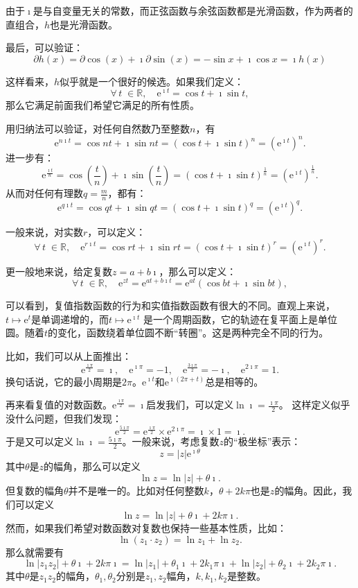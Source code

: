 \documentclass[12pt,UTF8]{ctexbook}
\newcommand{\e}{\mathrm{e}}
\theoremstyle{definition}
\theoremstyle{plain}
\begin{document}
由于$\imath$是与自变量无关的常数，而正弦函数与余弦函数都是光滑函数，作为两者的直组合，$h$也是光滑函数。

最后，可以验证：
$$ \partial h(x) = \partial \cos{(x)} + \imath \partial \sin{(x)} = - \sin{x} + \imath \cos{x} = \imath h(x) $$

这样看来，$h$似乎就是一个很好的候选。如果我们定义：
$$ \forall \, t \; \in \mathbb{R}, \quad  \e^{\imath t} = \cos{t} + \imath \sin{t}, $$
那么它满足前面我们希望它满足的所有性质。

用归纳法可以验证，对任何自然数乃至整数$n$，有
$$ \e^{n\imath t} = \cos{nt} + \imath \sin{nt} = (\cos{t} + \imath \sin{t})^n = \left( \e^{\imath t} \right)^n. $$
进一步有：
$$ \e^{\frac{\imath t}{n}} = \cos{\left(\frac{t}{n}\right)} + \imath \sin{\left(\frac{t}{n}\right)} = (\cos{t} + \imath \sin{t})^{\frac{1}{n}} = \left( \e^{\imath t} \right)^{\frac{1}{n}}. $$
从而对任何有理数$q = \frac{m}{n}$，都有：
$$ \e^{q\imath t} = \cos{qt} + \imath \sin{qt} = (\cos{t} + \imath \sin{t})^q = \left( \e^{\imath t} \right)^q. $$

一般来说，对实数$r$，可以定义：
$$ \forall \, t \; \in \mathbb{R}, \quad \e^{r\imath t} = \cos{rt} + \imath \sin{rt} = (\cos{t} + \imath \sin{t})^r = \left( \e^{\imath t} \right)^r. $$

更一般地来说，给定复数$z = a + b\imath$，那么可以定义：
$$ \forall \, t \; \in \mathbb{R}, \quad  \e^{z t} = \e^{at + b\imath t} = \e^{at} \left( \cos{bt} + \imath \sin{bt} \right), $$

可以看到，复值指数函数的行为和实值指数函数有很大的不同。直观上来说，$t\mapsto \e^{t}$是单调递增的，而$t\mapsto \e^{\imath t}$
是一个周期函数，它的轨迹在复平面上是单位圆。随着$t$的变化，函数绕着单位圆不断“转圈”。这是两种完全不同的行为。

比如，我们可以从上面推出：
$$ \e^{\frac{\imath\pi}{2}} = \imath, \quad \e^{\imath\pi} = -1, \quad \e^{\frac{3\imath\pi}{2}} = -\imath, \quad \e^{2\imath\pi} = 1. $$
换句话说，它的最小周期是$2\pi$。$\e^{\imath t}$和$\e^{\imath(2\pi + t)}$总是相等的。

再来看复值的对数函数。$\e^{\frac{\imath\pi}{2}} = \imath$启发我们，可以定义$\ln{\imath} = \frac{\imath\pi}{2}$。
这样定义似乎没什么问题，但我们发现：
$$ \e^{\frac{5\imath\pi}{2}} = \e^{\frac{\imath\pi}{2}} \times \e^{2\imath\pi} = \imath \times 1 = \imath. $$
于是又可以定义$\ln{\imath} = \frac{5\imath\pi}{2}$。一般来说，考虑复数$z$的“极坐标”表示：
$$ z = |z| \e^{\imath \theta}$$
其中$\theta$是$z$的幅角，那么可以定义
$$\ln{z} = \ln{|z|} + \theta \imath.$$
但复数的幅角$\theta$并不是唯一的。比如对任何整数$k$，$\theta + 2k\pi$也是$z$的幅角。因此，我们可以定义
$$\ln{z} = \ln{|z|} + \theta \imath + 2k\pi\imath.$$
然而，如果我们希望对数函数对复数也保持一些基本性质，比如：
$$ \ln{(z_1 \cdot z_2)} = \ln{z_1} + \ln{z_2}. $$
那么就需要有
$$ \ln{|z_1z_2|} + \theta \imath + 2k\pi\imath = \ln{|z_1|} + \theta_1 \imath + 2k_1\pi\imath + \ln{|z_2|} + \theta_2 \imath + 2k_2\pi\imath.$$
其中$\theta$是$z_1z_2$的幅角，$\theta_1, \theta_2$分别是$z_1, z_2$幅角，$k, k_1, k_2$是整数。
\end{document}
